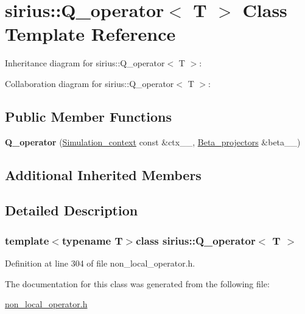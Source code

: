 \hypertarget{classsirius_1_1_q__operator}{}\section{sirius\+:\+:Q\+\_\+operator$<$ T $>$ Class Template Reference}
\label{classsirius_1_1_q__operator}


Inheritance diagram for sirius\+:\+:Q\+\_\+operator$<$ T $>$\+:


Collaboration diagram for sirius\+:\+:Q\+\_\+operator$<$ T $>$\+:
\subsection*{Public Member Functions}
\begin{DoxyCompactItemize}
\item 
\hypertarget{classsirius_1_1_q__operator_ab5e75e7339bdb8a2633a59395e512dab}{}{\bfseries Q\+\_\+operator} (\hyperlink{classsirius_1_1_simulation__context}{Simulation\+\_\+context} const \&ctx\+\_\+\+\_\+, \hyperlink{classsirius_1_1_beta__projectors}{Beta\+\_\+projectors} \&beta\+\_\+\+\_\+)\label{classsirius_1_1_q__operator_ab5e75e7339bdb8a2633a59395e512dab}

\end{DoxyCompactItemize}
\subsection*{Additional Inherited Members}


\subsection{Detailed Description}
\subsubsection*{template$<$typename T$>$class sirius\+::\+Q\+\_\+operator$<$ T $>$}



Definition at line 304 of file non\+\_\+local\+\_\+operator.\+h.



The documentation for this class was generated from the following file\+:\begin{DoxyCompactItemize}
\item 
\hyperlink{non__local__operator_8h}{non\+\_\+local\+\_\+operator.\+h}\end{DoxyCompactItemize}
